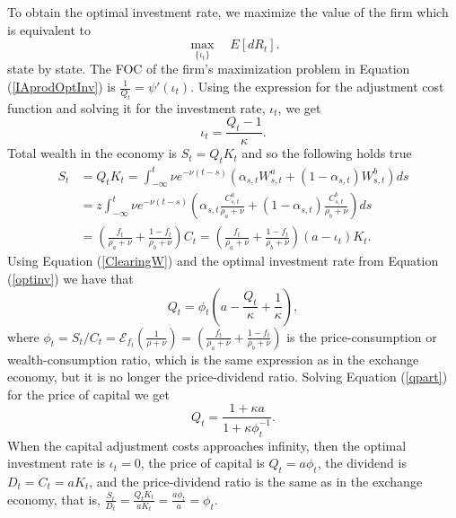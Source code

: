 To obtain the optimal investment rate, we maximize the value of the firm which is equivalent to 
\begin{equation}\label{IAprodOptInv}
	\underset{\{\iota_t \}}{\max} \quad E [ dR_t].
\end{equation}
state by state. The FOC of the firm's maximization problem in Equation (\ref{IAprodOptInv}) is $\frac{1}{Q_t} = \psi' \left(\iota_t\right)$. Using the expression for the adjustment cost function and solving it for the investment rate, $\iota_t$, we get
\begin{equation}\label{optinv}
	\iota_t = \frac{Q_t - 1}{\kappa}.
\end{equation}
Total wealth in the economy is $S_t = Q_t K_t$ and so the following holds true
\begin{equation}\label{ClearingW}
 \begin{split}	
 	S_t &= Q_t K_t = \int_{-\infty}^t \nu e^{-\nu\left(t-s\right)}\left(\alpha_{s,t}W^a_{s,t} + \left(1-\alpha_{s,t}\right)W^b_{s,t}\right)ds  \\
	&=z  \int_{-\infty}^t \nu e^{-\nu\left(t-s\right)}\left(\alpha_{s,t}\frac{C^a_{s,t}}{\rho_a+\nu} 
	+ \left(1-\alpha_{s,t}\right)\frac{C^b_{s,t}}{\rho_b+\nu}\right)ds   \\
	&=  \left(\frac{f_t}{\rho_a+\nu}+\frac{1-f_t}{\rho_b+\nu}\right)C_t 
	= \left(\frac{f_t}{\rho_a+\nu}+\frac{1-f_t}{\rho_b+\nu}\right)\left(a-\iota_t\right)K_t.
 \end{split}	
\end{equation}
Using Equation (\ref{ClearingW}) and the optimal investment rate from Equation (\ref{optinv}) we have that
\begin{equation}\label{qpart}
	Q_t = \phi_t \left(a-\frac{Q_t}{\kappa} + \frac{1}{\kappa}\right),
\end{equation}
where $\phi_t = S_t/C_t = \mathcal{E}_{f_t}\left(\frac{1}{\rho+\nu}\right)=\left(\frac{f_t}{\rho_a+\nu}+\frac{1-f_t}{\rho_b+\nu}\right)$ is the price-consumption or wealth-consumption ratio, which is the same expression as in the exchange economy, but it is no longer the price-dividend ratio. Solving Equation (\ref{qpart}) for the price of capital we get
\begin{equation}
	Q_t = \frac{1+\kappa a}{1+\kappa \phi_t^{-1}}.
\end{equation}
When the capital adjustment costs approaches infinity, then the optimal investment rate is $\iota_t = 0$,  the price of capital is $Q_t = a \phi_t$, the dividend is $D_t = C_t = aK_t$, and the price-dividend ratio is the same as in the exchange economy, that is, $\frac{S_t}{D_t} = \frac{Q_t K_t}{a K_t} = \frac{a \phi_t}{a} = \phi_t$. 

